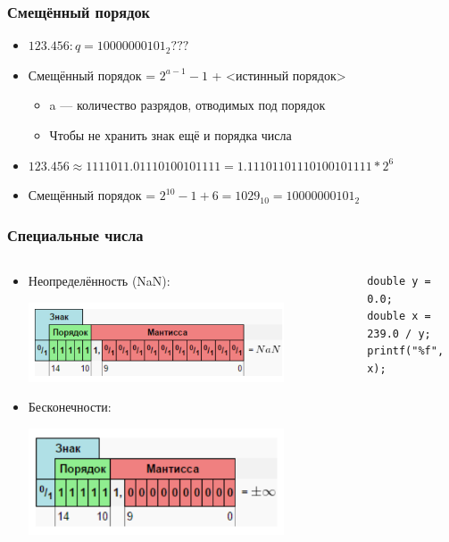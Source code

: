 \documentclass[xetex,mathserif,serif]{beamer}
\begin{document}
	\begin{frame}
		\frametitle{Смещённый порядок}
		\begin{itemize}
			\item $123.456:  q = 10000000101_2???$
			\item Смещённый порядок =  $2^{a - 1} - 1$ + <истинный порядок>
			\begin{itemize}
				\item a --- количество разрядов, отводимых под порядок
				\item Чтобы не хранить знак ещё и порядка числа
			\end{itemize}
			\item $123.456 \approx 1111011.01110100101111 = 1.11101101110100101111 * 2^6$
			\item Смещённый порядок = $2^{10} - 1 + 6 = 1029_{10} = 10000000101_2$
		\end{itemize}
	\end{frame}

	\begin{frame}[fragile]
		\frametitle{Специальные числа}
		\begin{columns}
			\begin{column}{0.6\textwidth}
				\begin{itemize}
					\item Неопределённость (NaN):
					\begin{center}
						\includegraphics[width=0.8\textwidth]{nan.png}
					\end{center}
					\item Бесконечности:
					\begin{center}
						\includegraphics[width=0.8\textwidth]{infinity.png}
					\end{center}
				\end{itemize}
			\end{column}
			\begin{column}{0.4\textwidth}
				\begin{footnotesize}
					\begin{verbatim}
double y = 0.0;
double x = 239.0 / y;
printf("%f", x);
					\end{verbatim}
				\end{footnotesize}
			\end{column}
		\end{columns}
	\end{frame}
\end{document}
